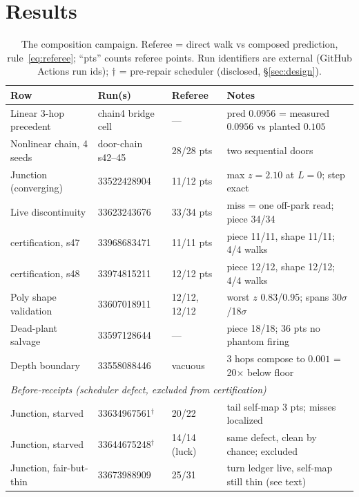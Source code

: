 \documentclass[11pt,a4paper]{article}
\begin{document}
\section{Results}
\label{sec:results}

\begin{table}[t]
\centering
\caption{The composition campaign. Referee = direct walk vs composed
prediction, rule~\eqref{eq:referee}; ``pts'' counts referee points.
Run identifiers are external (GitHub Actions run ids); $\dagger$ =
pre-repair scheduler (disclosed, \S\ref{sec:design}).}
\label{tab:rows}
\small
\begin{tabular}{llll}
\toprule
Row & Run(s) & Referee & Notes \\
\midrule
Linear 3-hop precedent & chain4 bridge cell & --- &
  pred $0.0956$ = measured $0.0956$ vs planted $0.105$ \\
Nonlinear chain, 4 seeds & door-chain s42--45 & 28/28 pts &
  two sequential doors \\
Junction (converging) & 33522428904 & 11/12 pts &
  max $z{=}2.10$ at $L{=}0$; step exact \\
Live discontinuity & 33623243676 & 33/34 pts &
  miss = one off-park read; piece 34/34 \\
\quad certification, s47 & 33968683471 & 11/11 pts &
  piece 11/11, shape 11/11; 4/4 walks \\
\quad certification, s48 & 33974815211 & 12/12 pts &
  piece 12/12, shape 12/12; 4/4 walks \\
Poly shape validation & 33607018911 & 12/12, 12/12 &
  worst $z$ 0.83/0.95; spans 30$\sigma$/18$\sigma$ \\
Dead-plant salvage & 33597128644 & --- &
  piece 18/18; 36 pts no phantom firing \\
Depth boundary & 33558088446 & vacuous &
  3 hops compose to $0.001$ = 20$\times$ below floor \\
\midrule
\multicolumn{4}{l}{\emph{Before-receipts (scheduler defect, excluded from certification)}} \\
Junction, starved & 33634967561$^\dagger$ & 20/22 &
  tail self-map 3 pts; misses localized \\
Junction, starved & 33644675248$^\dagger$ & 14/14 (luck) &
  same defect, clean by chance; excluded \\
Junction, fair-but-thin & 33673988909 & 25/31 &
  turn ledger live, self-map still thin (see text) \\
\bottomrule
\end{tabular}
\end{table}
\end{document}
